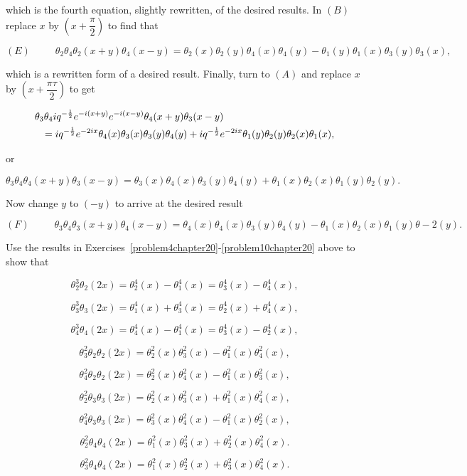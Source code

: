 \begin{solution}
which is the fourth equation, slightly rewritten, of the desired results. In $(B)$ replace $x$ by $\left( x + \dfrac{\pi}{2} \right)$ to find that

$$(E) \hspace{30pt} \theta_2 \theta_4 \theta_2(x+y) \theta_4(x-y) = \theta_2(x) \theta_2(y) \theta_4(x) \theta_4(y) - \theta_1(y) \theta_1(x) \theta_3(y) \theta_3(x),$$

which is a rewritten form of a desired result. Finally, turn to $(A)$ and replace $x$ by $\left( x + \dfrac{\pi \tau}{2} \right)$ to get

\begin{eqnarray*}
\lefteqn{\theta_3\theta_4 iq^{-\frac{1}{2}}e^{-i(x+y)}e^{-i(x-y)} \theta_4(x+y) \theta_3(x-y)} \\
&& = i q^{-\frac{1}{2}} e^{-2ix} \theta_4(x) \theta_3(x) \theta_3(y) \theta_4(y) + iq^{-\frac{1}{2}} e^{-2ix} \theta_1(y) \theta_2(y) \theta_2(x) \theta_1(x),
\end{eqnarray*}

or

$$\theta_3 \theta_4 \theta_4(x+y) \theta_3(x-y) = \theta_3(x) \theta_4(x) \theta_3(y) \theta_4(y) + \theta_1(x) \theta_2(x) \theta_1(y) \theta_2(y).$$

Now change $y$ to $(-y)$ to arrive at the desired result

$$(F) \hspace{30pt} \theta_3 \theta_4 \theta_3(x+y) \theta_4(x-y) = \theta_4(x) \theta_4(x) \theta_3(y) \theta_4(y) - \theta_1(x) \theta_2(x) \theta_1(y) \theta-2(y).$$
\end{solution}
\begin{problem}\label{problem11chapter20}
Use the results in Exercises~\ref{problem4chapter20}-\ref{problem10chapter20} above to show that 

$$\theta_2^3\theta_2(2x)=\theta_2^4(x)-\theta_1^4(x)=\theta_3^4(x)-\theta_4^4(x),$$

$$\theta_3^3\theta_3(2x) = \theta_1^4(x) + \theta_3^4(x) = \theta_2^4(x) + \theta_4^4(x),$$

$$\theta_4^3\theta_4(2x) = \theta_4^4(x) - \theta_1^4(x) = \theta_3^4(x) - \theta_2^4(x),$$

$$\theta_3^2 \theta_2 \theta_2(2x) = \theta_2^2(x) \theta_3^2(x) - \theta_1^2(x) \theta_4^2(x),$$

$$\theta_4^2\theta_2 \theta_2(2x) = \theta_2^2(x) \theta_4^2(x) - \theta_1^2(x) \theta_3^2(x),$$

$$\theta_2^2\theta_3\theta_3(2x) = \theta_2^2(x) \theta_3^2(x) + \theta_1^2(x) \theta_4^2(x),$$

$$\theta_4^2\theta_3\theta_3(2x) = \theta_3^2(x) \theta_4^2(x) - \theta_1^2(x) \theta_2^2(x),$$

$$\theta_2^2 \theta_4 \theta_4(2x) = \theta_1^2(x) \theta_3^2(x) + \theta_2^2(x) \theta_4^2(x).$$

$$\theta_3^2\theta_4 \theta_4(2x) = \theta_1^2(x) \theta_2^2(x) + \theta_3^2(x) \theta_4^2(x).$$
\end{problem}
